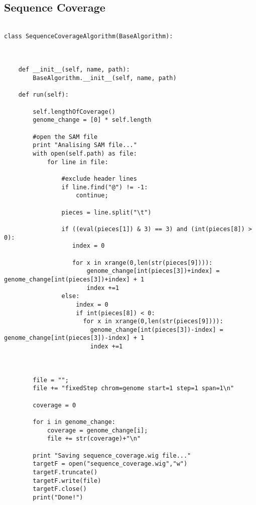 \subsection{Sequence Coverage}
\tiny
\begin{verbatim}

class SequenceCoverageAlgorithm(BaseAlgorithm):



    def __init__(self, name, path):
        BaseAlgorithm.__init__(self, name, path)

    def run(self):

        self.lengthOfCoverage()
        genome_change = [0] * self.length

        #open the SAM file
        print "Analising SAM file..."
        with open(self.path) as file:
            for line in file:

                #exclude header lines
                if line.find("@") != -1:
                    continue;

                pieces = line.split("\t")

                if ((eval(pieces[1]) & 3) == 3) and (int(pieces[8]) > 0):
                   index = 0

                   for x in xrange(0,len(str(pieces[9]))):
                       genome_change[int(pieces[3])+index] = genome_change[int(pieces[3])+index] + 1
                       index +=1
                else:
                    index = 0
                    if int(pieces[8]) < 0:
                      for x in xrange(0,len(str(pieces[9]))):
                        genome_change[int(pieces[3])-index] = genome_change[int(pieces[3])-index] + 1
                        index +=1



        file = "";
        file += "fixedStep chrom=genome start=1 step=1 span=1\n"

        coverage = 0

        for i in genome_change:
            coverage = genome_change[i];
            file += str(coverage)+"\n"

        print "Saving sequence_coverage.wig file..."
        targetF = open("sequence_coverage.wig","w")
        targetF.truncate()
        targetF.write(file)
        targetF.close()
        print("Done!")
\end{verbatim}


